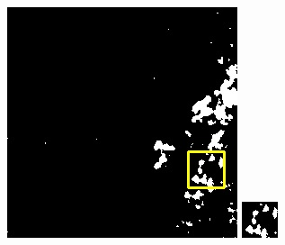\documentclass[10pt,UTF8,fntef]{ctexart}
\begin{document}
\begin{figure}[H]
{{\begin{minipage}[b]{0.15\linewidth}
            \includegraphics[width=1\linewidth]{../log/spoon3/cut/LC81570452014213LGN00_06142_segnet.jpg}\vspace{4pt}
            \includegraphics[width=1\linewidth]{../log/spoon3/cut/tmp_cut_LC81570452014213LGN00_06142_segnet.jpg}\vspace{4pt}

\end{minipage}}}
\end{figure}
\end{document}
